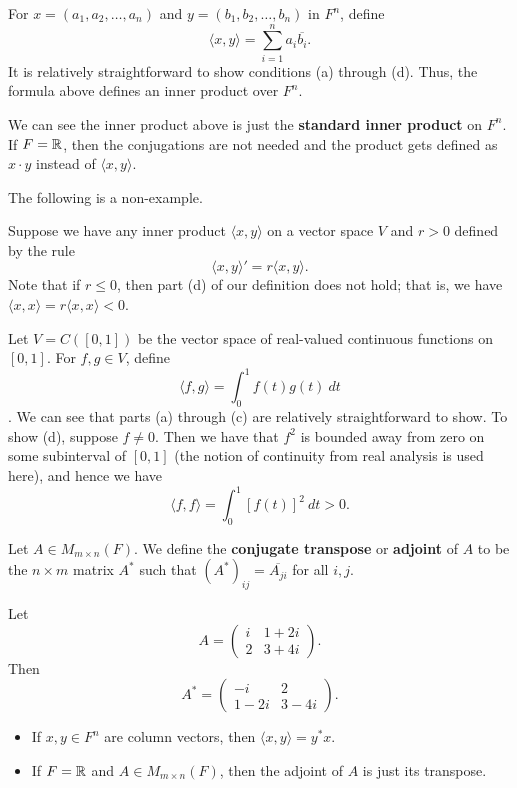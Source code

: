 \begin{eg}
    For \( x = ({a}_{1}, {a}_{2}, \dots, {a}_{n}) \) and \( y = ({b}_{1}, {b}_{2}, \dots, {b}_{n}) \) in \( F^{n} \), define 
    \[  \langle x,y \rangle = \sum_{ i=1 }^{ n } {a}_{i} \overline{{b}_{i}}. \]
It is relatively straightforward to show conditions (a) through (d). Thus, the formula above defines an inner product over \( F^{n} \).
\end{eg}

\begin{remark}
 We can see the inner product above is just the \textbf{standard inner product} on \( F^{n} \). If \( F = \mathbb{R}  \), then the conjugations are not needed and the product gets defined as \( x \cdot y  \) instead of \( \langle  x,y  \rangle \).
\end{remark}

The following is a non-example.

\begin{eg}
    Suppose we have any inner product \( \langle  x,y  \rangle \) on a vector space \( V  \) and \( r > 0  \) defined by the rule
    \[  \langle x,y \rangle' = r \langle x,y \rangle.  \]
    Note that if \( r \leq  0  \), then part (d) of our definition does not hold; that is, we have \( \langle x,x \rangle = r \langle x,x \rangle < 0  \).
\end{eg}

\begin{eg}
    Let \( V = C([0,1]) \) be the vector space of real-valued continuous functions on \( [0,1] \). For \( f,g \in V  \), define 
    \[ \langle f,g \rangle = \int_{ 0 }^{ 1 } f(t) g(t) \ dt \]. 
    We can see that parts (a) through (c) are relatively straightforward to show. To show (d), suppose \( f \neq 0  \). Then we have that \( f^{2} \) is bounded away from zero on some subinterval of \( [0,1] \) (the notion of continuity from real analysis is used here), and hence we have
    \[  \langle f,f \rangle = \int_{ 0 }^{ 1 }  [f(t)]^{2} \ dt > 0. \]
\end{eg}

\begin{definition}
    Let \( A \in {M}_{m \times n}(F) \). We define the \textbf{conjugate transpose} or \textbf{adjoint} of \( A  \) to be the \( n \times m  \) matrix \( A^*  \) such that \( {(A^*)}_{ij} = \overline{{A}_{ji}} \) for all \( i,j  \).
\end{definition}

\begin{eg}
    Let 
    \[  A = \begin{pmatrix} 
        i & 1 + 2i \\
        2 & 3 + 4i 
              \end{pmatrix}. \]
    Then
        \[  A^{*} = \begin{pmatrix} 
                   -i & 2 \\
                   1 - 2i & 3 - 4i 
                  \end{pmatrix}. \]
\end{eg}

\begin{itemize}
    \item If \( x,y \in F^{n} \) are column vectors, then \( \langle x,y \rangle = y^{*}x  \).
    \item If \( F = \mathbb{R}  \) and \( A \in {M}_{m \times n}(F) \), then the adjoint of \( A  \) is just its transpose.
\end{itemize}
